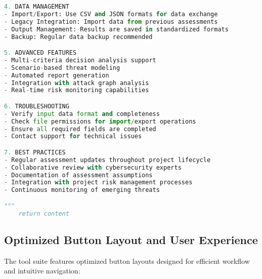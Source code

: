 \documentclass[binding=0.6cm]{sapthesis}
\begin{document}
\begin{lstlisting}[language=Python, caption=Enhanced Help System Implementation]
4. DATA MANAGEMENT
- Import/Export: Use CSV and JSON formats for data exchange
- Legacy Integration: Import data from previous assessments
- Output Management: Results are saved in standardized formats
- Backup: Regular data backup recommended

5. ADVANCED FEATURES
- Multi-criteria decision analysis support
- Scenario-based threat modeling
- Automated report generation
- Integration with attack graph analysis
- Real-time risk monitoring capabilities

6. TROUBLESHOOTING
- Verify input data format and completeness
- Check file permissions for import/export operations
- Ensure all required fields are completed
- Contact support for technical issues

7. BEST PRACTICES
- Regular assessment updates throughout project lifecycle
- Collaborative review with cybersecurity experts
- Documentation of assessment assumptions
- Integration with project risk management processes
- Continuous monitoring of emerging threats

"""
    return content
\end{lstlisting}

\subsection{Optimized Button Layout and User Experience}

The tool suite features optimized button layouts designed for efficient workflow and intuitive navigation:
\end{document}
